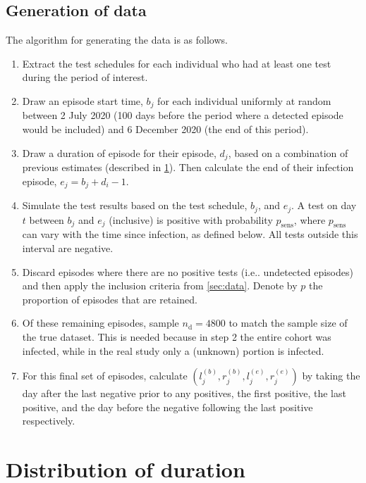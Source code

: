 \documentclass[referee,useAMS,usenatbib]{biom}
\makeatletter
\newcommand{\psens}{p_\text{sens}}
\newcommand{\ndet}{n_\text{d}}
\DeclareRobustCommand\onedot{\futurelet\@let@token\@onedot}
\def\@onedot{\ifx\@let@token.\else.\null\fi\xspace}
\def\ie{i.e\onedot} \def\Ie{{I.e}\onedot}
\makeatother
\begin{document}
\subsection{Generation of data} \label{sec:simulation-data}

The algorithm for generating the data is as follows.

\begin{enumerate}
    \item Extract the test schedules for each individual who had at least one test during the period of interest.
    \item Draw an episode start time, $b_{j}$ for each individual uniformly at random between 2 July 2020 (100 days before the period where a detected episode would be included) and 6 December 2020 (the end of this period).
    \item Draw a duration of episode for their episode, $d_j$, based on a combination of previous estimates (described in \cref{sec:simulation-truth}). Then calculate the end of their infection episode, $e_{j} = b_{j} + d_i - 1$.
    \item Simulate the test results based on the test schedule, $b_{j}$, and $e_{j}$. A test on day $t$ between $b_{j}$ and $e_{j}$ (inclusive) is positive with probability $\psens$, where $\psens$ can vary with the time since infection, as defined below. All tests outside this interval are negative.
    \item Discard episodes where there are no positive tests (\ie undetected episodes) and then apply the inclusion criteria from \cref{sec:data}. Denote by $p$ the proportion of episodes that are retained.
    \item Of these remaining episodes, sample $\ndet = 4800$ to match the sample size of the true dataset. This is needed because in step 2 the entire cohort was infected, while in the real study only a (unknown) portion is infected.
    \item For this final set of episodes, calculate $(l_j^{(b)}, r_j^{(b)}, l_j^{(e)}, r_j^{(e)})$ by taking the day after the last negative prior to any positives, the first positive, the last positive, and the day before the negative following the last positive respectively.
\end{enumerate}

\section{Distribution of duration} \label{sec:simulation-truth}
\end{document}
